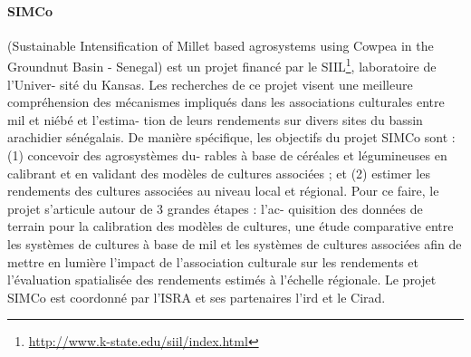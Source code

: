   
  \paragraph{SIMCo} (Sustainable Intensification of Millet based agrosystems using Cowpea in the Groundnut Basin - Senegal) est un projet financé par le SIIL\footnote{\url{http://www.k-state.edu/siil/index.html}}, laboratoire de l’Univer-
sité du Kansas. Les recherches de ce projet visent une meilleure compréhension des
mécanismes impliqués dans les associations culturales entre mil et niébé et l’estima-
tion de leurs rendements sur divers sites du bassin arachidier sénégalais. De manière
spécifique, les objectifs du projet SIMCo sont : (1) concevoir des agrosystèmes du-
rables à base de céréales et légumineuses en calibrant et en validant des modèles
de cultures associées ; et (2) estimer les rendements des cultures associées au niveau
local et régional. Pour ce faire, le projet s’articule autour de 3 grandes étapes : l’ac-
quisition des données de terrain pour la calibration des modèles de cultures, une
étude comparative entre les systèmes de cultures à base de mil et les systèmes de
cultures associées afin de mettre en lumière l’impact de l’association culturale sur les
rendements et l’évaluation spatialisée des rendements estimés à l’échelle régionale.
Le projet SIMCo est coordonné par l’ISRA et ses partenaires l’\acrshort{ird} et le Cirad.
  
